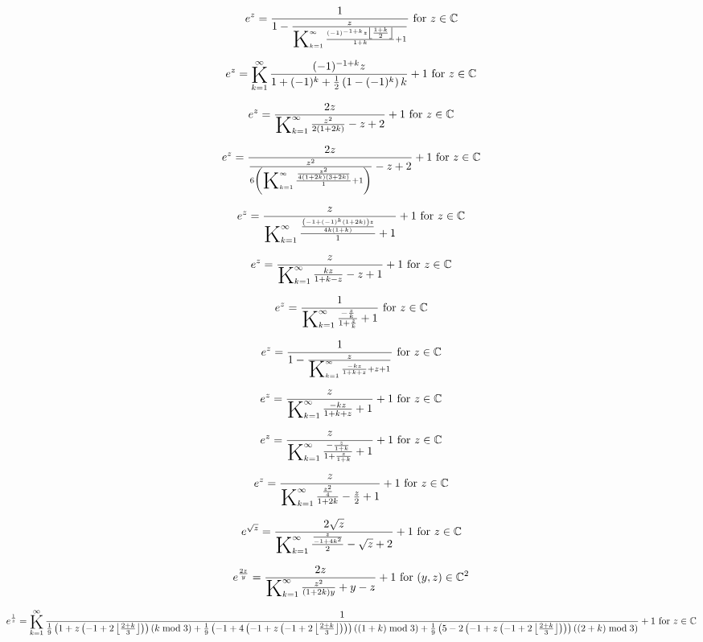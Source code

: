 \documentclass{article}
\newcommand{\bigK}{\mathop{\raisebox{-5pt}{\huge K}}}
\begin{document}
\[e^z=\frac{1}{1-\frac{z}{\bigK_{k=1}^{\infty}\frac{(-1)^{-1+k} z \left\lfloor \frac{1+k}{2}\right\rfloor }{1+k}+1}}\text{ for }z\in \mathbb{C}\] 

\[e^z=\bigK_{k=1}^{\infty}\frac{(-1)^{-1+k} z}{1+(-1)^k+\frac{1}{2} \left(1-(-1)^k\right) k}+1\text{ for }z\in \mathbb{C}\] 

\[e^z=\frac{2 z}{\bigK_{k=1}^{\infty}\frac{z^2}{2 (1+2 k)}-z+2}+1\text{ for }z\in \mathbb{C}\] 

\[e^z=\frac{2 z}{\frac{z^2}{6 \left(\bigK_{k=1}^{\infty}\frac{\frac{z^2}{4 (1+2 k) (3+2 k)}}{1}+1\right)}-z+2}+1\text{ for }z\in \mathbb{C}\] 

\[e^z=\frac{z}{\bigK_{k=1}^{\infty}\frac{\frac{\left(-1+(-1)^k (1+2 k)\right) z}{4 k (1+k)}}{1}+1}+1\text{ for }z\in \mathbb{C}\] 

\[e^z=\frac{z}{\bigK_{k=1}^{\infty}\frac{k z}{1+k-z}-z+1}+1\text{ for }z\in \mathbb{C}\] 

\[e^z=\frac{1}{\bigK_{k=1}^{\infty}\frac{-\frac{z}{k}}{1+\frac{z}{k}}+1}\text{ for }z\in \mathbb{C}\] 

\[e^z=\frac{1}{1-\frac{z}{\bigK_{k=1}^{\infty}\frac{-k z}{1+k+z}+z+1}}\text{ for }z\in \mathbb{C}\] 

\[e^z=\frac{z}{\bigK_{k=1}^{\infty}\frac{-k z}{1+k+z}+1}+1\text{ for }z\in \mathbb{C}\] 

\[e^z=\frac{z}{\bigK_{k=1}^{\infty}\frac{-\frac{z}{1+k}}{1+\frac{z}{1+k}}+1}+1\text{ for }z\in \mathbb{C}\] 

\[e^z=\frac{z}{\bigK_{k=1}^{\infty}\frac{\frac{z^2}{4}}{1+2 k}-\frac{z}{2}+1}+1\text{ for }z\in \mathbb{C}\] 

\[e^{\sqrt{z}}=\frac{2 \sqrt{z}}{\bigK_{k=1}^{\infty}\frac{\frac{z}{-1+4 k^2}}{2}-\sqrt{z}+2}+1\text{ for }z\in \mathbb{C}\] 

\[e^{\frac{2 z}{y}}=\frac{2 z}{\bigK_{k=1}^{\infty}\frac{z^2}{(1+2 k) y}+y-z}+1\text{ for }(y,z)\in \mathbb{C}^2\] 

\[e^{\frac{1}{z}}=\bigK_{k=1}^{\infty}\frac{1}{\frac{1}{9} \left(1+z \left(-1+2 \left\lfloor \frac{2+k}{3}\right\rfloor \right)\right) (k \bmod 3)+\frac{1}{9} \left(-1+4 \left(-1+z \left(-1+2 \left\lfloor \frac{2+k}{3}\right\rfloor \right)\right)\right) ((1+k) \bmod 3)+\frac{1}{9} \left(5-2 \left(-1+z \left(-1+2 \left\lfloor \frac{2+k}{3}\right\rfloor \right)\right)\right) ((2+k) \bmod 3)}+1\text{ for }z\in \mathbb{C}\] 
\end{document}
